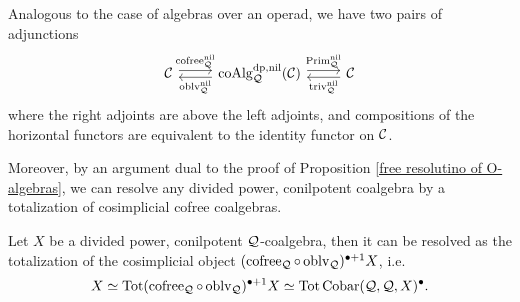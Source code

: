 Analogous to the case of algebras over an operad, we have two pairs of adjunctions 
\[
\begin{tikzcd}
\CC & \coAlg^{\divpow, \nil}_{\CQ}(\CC) & \CC
	\arrow[from=1-1, to= 1-2, shift left = 1, "\cofree^{\nil}_{\CQ}" above]
	\arrow[from=1-2, to=1-1, shift left = 1, "\oblv^{\nil}_{\CQ}" below]
	\arrow[from=1-2, to= 1-3, shift left = 1, "\operatorname{Prim}^{\nil}_{\CQ}" above]
	\arrow[from=1-3, to=1-2, shift left = 1, "\trivial^{\nil}_{\CQ}" below]
\end{tikzcd}
\]
where the right adjoints are above the left adjoints,
and compositions of the horizontal functors are equivalent to the identity functor on ${\mathcal{C}}$.

Moreover, by an argument dual to the proof of Proposition \ref{free resolutino of O-algebras}, we can resolve any divided power, conilpotent coalgebra by a totalization of cosimplicial cofree coalgebras.
\begin{proposition}
Let $X$ be a divided power, conilpotent ${\mathcal{Q}}$-coalgebra, then it can be resolved as the totalization of the cosimplicial object $(\operatorname{cofree}_{{\mathcal{Q}}}\circ \operatorname{oblv}_{{\mathcal{Q}}})^{\bullet + 1}X$, i.e. 
\begin{equation}
\label{(3.5)}
    X \simeq
\operatorname{\operatorname{Tot}} (\operatorname{cofree}_{{\mathcal{Q}}}\circ \operatorname{oblv}_{{\mathcal{Q}}})^{\bullet + 1}X
\simeq \operatorname{\operatorname{Tot}} \operatorname{Cobar}({\mathcal{Q}}, {\mathcal{Q}}, X)^{\bullet}.
\end{equation}
\end{proposition}



